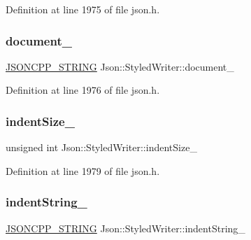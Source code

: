 Definition at line 1975 of file json.\+h.

\hypertarget{class_json_1_1_styled_writer_ae967b0c77e4d7cb889ce7b6ee4ce28d7}{}\label{class_json_1_1_styled_writer_ae967b0c77e4d7cb889ce7b6ee4ce28d7} 
\subsubsection{\texorpdfstring{document\+\_\+}{document\_}}
{\footnotesize\ttfamily \hyperlink{config_8h_a1e723f95759de062585bc4a8fd3fa4be}{J\+S\+O\+N\+C\+P\+P\+\_\+\+S\+T\+R\+I\+NG} Json\+::\+Styled\+Writer\+::document\+\_\+\hspace{0.3cm}{\ttfamily [private]}}



Definition at line 1976 of file json.\+h.

\hypertarget{class_json_1_1_styled_writer_a0b5ab768cc56433d463eb1f03da8614e}{}\label{class_json_1_1_styled_writer_a0b5ab768cc56433d463eb1f03da8614e} 
\subsubsection{\texorpdfstring{indent\+Size\+\_\+}{indentSize\_}}
{\footnotesize\ttfamily unsigned int Json\+::\+Styled\+Writer\+::indent\+Size\+\_\+\hspace{0.3cm}{\ttfamily [private]}}



Definition at line 1979 of file json.\+h.

\hypertarget{class_json_1_1_styled_writer_a7d91709c94c152bd44eaf80faac130ae}{}\label{class_json_1_1_styled_writer_a7d91709c94c152bd44eaf80faac130ae} 
\subsubsection{\texorpdfstring{indent\+String\+\_\+}{indentString\_}}
{\footnotesize\ttfamily \hyperlink{config_8h_a1e723f95759de062585bc4a8fd3fa4be}{J\+S\+O\+N\+C\+P\+P\+\_\+\+S\+T\+R\+I\+NG} Json\+::\+Styled\+Writer\+::indent\+String\+\_\+\hspace{0.3cm}{\ttfamily [private]}}



